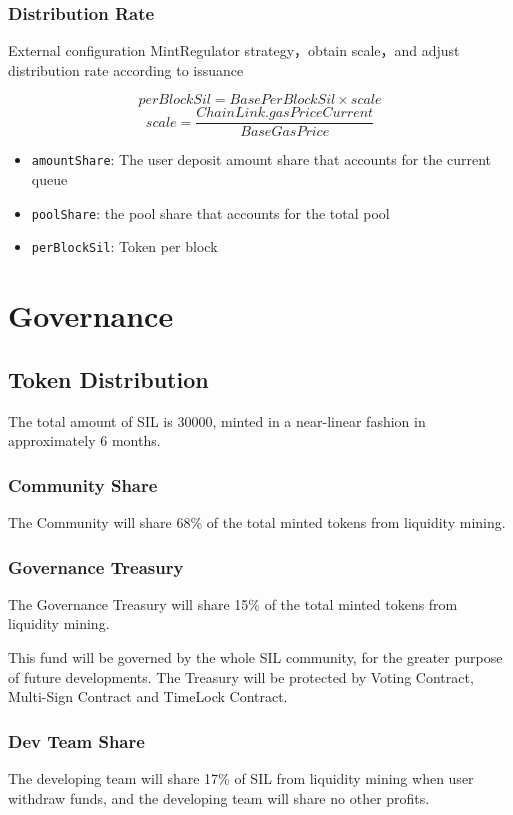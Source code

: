 \documentclass[11pt,letterpaper]{article}
\begin{document}
\begin{multicols}{2}
\subsubsection{Distribution Rate}
External configuration MintRegulator strategy，obtain scale，and adjust distribution rate according to issuance

\[ perBlockSil =  BasePerBlockSil \times scale \]
\[ scale = \frac{ChainLink.gasPriceCurrent}{BaseGasPrice} \]
\begin{itemize}
    \item \texttt{amountShare}: The user deposit amount share that accounts for the current queue
    \item \texttt{poolShare}: the pool share that accounts for the total pool
    \item \texttt{perBlockSil}: Token per block
\end{itemize}

\section{Governance}
\subsection{Token Distribution}
The total amount of SIL is 30000, minted in a near-linear fashion in approximately 6 months.

\subsubsection{Community Share}
The Community will share 68\% of the total minted tokens from liquidity mining.

\subsubsection{Governance Treasury}
The Governance Treasury will share 15\% of the total minted tokens from liquidity mining.

This fund will be governed by the whole SIL community, for the greater purpose of future developments. The Treasury will be protected by Voting Contract, Multi-Sign Contract and TimeLock Contract.

\subsubsection{Dev Team Share}
The developing team will share 17\% of SIL from liquidity mining when user withdraw funds, and the developing team will share no other profits.


\end{multicols}
\end{document}
